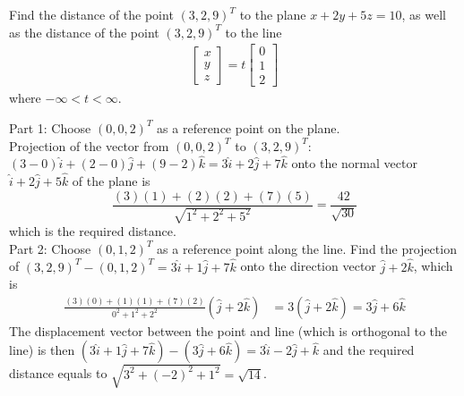 \begin{Exercise}
\label{ex:dist_pt_line_R3}
Find the distance of the point $(3,2,9)^T$ to the plane $x + 2y + 5z = 10$, as well as the distance of the point $(3,2,9)^T$ to the line 
\begin{align*}
\begin{bmatrix}
x\\
y\\
z
\end{bmatrix}
=
t
\begin{bmatrix}
0\\
1\\
2
\end{bmatrix}
\end{align*}
where $-\infty < t < \infty$.
\end{Exercise}
\begin{Answer}
Part 1: Choose $(0,0,2)^T$ as a reference point on the plane.\\
Projection of the vector from $(0,0,2)^T$ to $(3,2,9)^T$: $(3-0)\hat{i} + (2-0)\hat{j} + (9-2)\hat{k} = 3\hat{i} + 2\hat{j} + 7\hat{k}$ onto the normal vector $\hat{i} + 2\hat{j} + 5\hat{k}$ of the plane is
\[\frac{(3)(1)+(2)(2)+(7)(5)}{\sqrt{1^2 + 2^2 + 5^2}} = \frac{42}{\sqrt{30}}\] which is the required distance.\\
Part 2: Choose $(0,1,2)^T$ as a reference point along the line. Find the projection of $(3,2,9)^T - (0,1,2)^T = 3\hat{i} + 1\hat{j} + 7\hat{k}$ onto the direction vector $\hat{j} + 2\hat{k}$, which is
\begin{align*}
\frac{(3)(0)+(1)(1)+(7)(2)}{0^2 + 1^2 + 2^2} (\hat{j} + 2\hat{k}) &= 3(\hat{j} + 2\hat{k}) = 3\hat{j} + 6\hat{k}
\end{align*}
The displacement vector between the point and line (which is orthogonal to the line) is then $(3\hat{i} + 1\hat{j} + 7\hat{k}) - (3\hat{j} + 6\hat{k}) = 3\hat{i} - 2\hat{j} + \hat{k}$ and the required distance equals to $\sqrt{3^2 + (-2)^2 + 1^2} = \sqrt{14}$.
\end{Answer}

